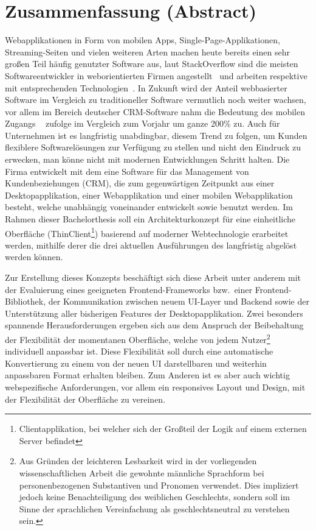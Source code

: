 \chapter{Zusammenfassung (Abstract)}

Webapplikationen in Form von mobilen Apps, Single-Page-Applikationen, Streaming-Seiten und vielen weiteren Arten machen heute bereits einen sehr großen Teil häufig genutzter Software aus, laut StackOverflow sind die meisten Softwareentwickler in weborientierten Firmen angestellt~\parencite{stackoverflow_survey_company_2018} und arbeiten respektive mit entsprechenden Technologien~\parencite{stackoverflow_survey_technologies_2018}.
In Zukunft wird der Anteil webbasierter Software im Vergleich zu traditioneller Software vermutlich noch weiter wachsen, vor allem im Bereich deutscher CRM-Software nahm die Bedeutung des mobilen Zugangs ~\parencite{bahr_capterra_2019} zufolge im Vergleich zum Vorjahr um ganze 200\% zu.
Auch für Unternehmen ist es langfristig unabdingbar, diesem Trend zu folgen, um Kunden flexiblere Softwarelösungen zur Verfügung zu stellen und nicht den Eindruck zu erwecken, man könne nicht mit modernen Entwicklungen Schritt halten.
Die Firma  entwickelt mit dem  eine Software für das Management von Kundenbeziehungen (\gls{CRM}), die zum gegenwärtigen Zeitpunkt aus einer Desktopapplikation, einer Webapplikation und einer mobilen Webapplikation besteht, welche unabhängig voneinander entwickelt sowie benutzt werden.
Im Rahmen dieser Bachelorthesis soll ein Architekturkonzept für eine einheitliche Oberfläche (ThinClient\footnote{Clientapplikation, bei welcher sich der Großteil der Logik auf einem externen Server befindet}) basierend auf moderner Webtechnologie erarbeitet werden, mithilfe derer die drei aktuellen Ausführungen des  langfristig abgelöst werden können.

Zur Erstellung dieses Konzepts beschäftigt sich diese Arbeit unter anderem mit der Evaluierung eines geeigneten Frontend-Frameworks bzw.\ einer Frontend-Bibliothek, der Kommunikation zwischen neuem UI-Layer und Backend sowie der Unterstützung aller bisherigen Features der Desktopapplikation.
Zwei besonders spannende Herausforderungen ergeben sich aus dem Anspruch der Beibehaltung der Flexibilität der momentanen Oberfläche, welche von jedem Nutzer\footnote{Aus Gründen der leichteren Lesbarkeit wird in der vorliegenden wissenschaftlichen Arbeit die gewohnte männliche Sprachform bei personenbezogenen Substantiven und Pronomen verwendet. Dies impliziert jedoch keine Benachteiligung des weiblichen Geschlechts, sondern soll im Sinne der sprachlichen Vereinfachung als geschlechtsneutral zu verstehen sein.} individuell anpassbar ist. Diese Flexibilität soll durch eine automatische Konvertierung zu einem von der neuen UI darstellbaren und weiterhin anpassbaren Format erhalten bleiben. Zum Anderen ist es aber auch wichtig webspezifische Anforderungen, vor allem ein responsives Layout und Design, mit der Flexibilität der Oberfläche zu vereinen.
